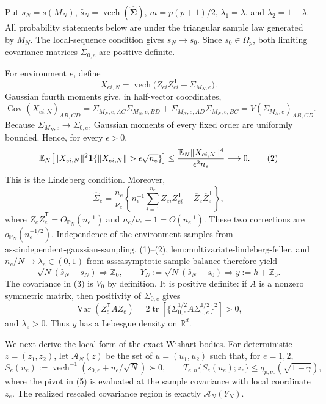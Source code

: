 Put \(s_N=s(M_N)\), \(\widehat s_N=\operatorname{vech}(\widehat{\boldsymbol\Sigma})\), \(m=p(p+1)/2\), \(\lambda_1=\lambda\), and \(\lambda_2=1-\lambda\). All probability statements below are under the triangular sample law generated by \(M_N\). The local-sequence condition gives \(s_N\to s_0\). Since \(s_0\in\Omega_p\), both limiting covariance matrices \(\Sigma_{0,e}\) are positive definite.

For environment \(e\), define
\[
 X_{ei,N}=\operatorname{vech}
 \bigl(Z_{ei}Z_{ei}^{\mathsf T}-\Sigma_{M_N,e}\bigr).
\]
Gaussian fourth moments give, in half-vector coordinates,
\[
 \operatorname{Cov}(X_{ei,N})_{AB,CD}
 =\Sigma_{M_N,e,AC}\Sigma_{M_N,e,BD}
  +\Sigma_{M_N,e,AD}\Sigma_{M_N,e,BC}
 =V(\Sigma_{M_N,e})_{AB,CD}.
 \tag{1}
\]
Because \(\Sigma_{M_N,e}\to\Sigma_{0,e}\), Gaussian moments of every fixed order are uniformly bounded. Hence, for every \(\epsilon>0\),
\[
 \mathbb E_N\!\left[
 \|X_{ei,N}\|^2
 {\bf1}\{\|X_{ei,N}\|>\epsilon\sqrt{n_e}\}
 \right]
 \le
 \frac{\mathbb E_N\|X_{ei,N}\|^4}{\epsilon^2n_e}
 \longrightarrow0.
 \tag{2}
\]
This is the Lindeberg condition. Moreover,
\[
 \widehat\Sigma_e
 =\frac{n_e}{\nu_e}
 \left\{n_e^{-1}\sum_{i=1}^{n_e}Z_{ei}Z_{ei}^{\mathsf T}
       -\overline Z_e\overline Z_e^{\mathsf T}\right\},
\]
where \(\overline Z_e\overline Z_e^{\mathsf T}=O_{\mathbb P_N}(n_e^{-1})\) and \(n_e/\nu_e-1=O(n_e^{-1})\). These two corrections are \(o_{\mathbb P_N}(n_e^{-1/2})\). Independence of the environment samples from \(\text{ass:independent-gaussian-sampling}\), (1)--(2), \(\text{lem:multivariate-lindeberg-feller}\), and \(n_e/N\to\lambda_e\in(0,1)\) from \(\text{ass:asymptotic-sample-balance}\) therefore yield
\[
 \sqrt N(\widehat s_N-s_N)\Rightarrow\mathbb Z_0,
 \qquad
 Y_N:=\sqrt N(\widehat s_N-s_0)
 \Rightarrow y:=h+\mathbb Z_0.
 \tag{3}
\]
The covariance in (3) is \(V_0\) by definition. It is positive definite: if \(A\) is a nonzero symmetric matrix, then positivity of \(\Sigma_{0,e}\) gives
\[
 \operatorname{Var}(Z_e^{\mathsf T}AZ_e)
 =2\operatorname{tr}\!\left[
   \{\Sigma_{0,e}^{1/2}A\Sigma_{0,e}^{1/2}\}^2
 \right]>0,
 \tag{4}
\]
and \(\lambda_e>0\). Thus \(y\) has a Lebesgue density on \(\mathbb R^d\).

We next derive the local form of the exact Wishart bodies. For deterministic \(z=(z_1,z_2)\), let \(\mathcal A_N(z)\) be the set of \(u=(u_1,u_2)\) such that, for \(e=1,2\),
\[
 S_e(u_e):=\operatorname{vech}^{-1}(s_{0,e}+u_e/\sqrt N)\succ0,
 \qquad
 T_{e,n}\{S_e(u_e);z_e\}
 \le q_{p,\nu_e}(\sqrt{1-\gamma}),
 \tag{5}
\]
where the pivot in (5) is evaluated at the sample covariance with local coordinate \(z_e\). The realized rescaled covariance region is exactly \(\mathcal A_N(Y_N)\).

